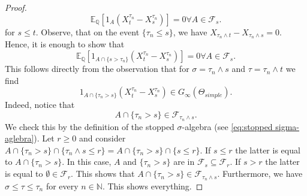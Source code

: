 \documentclass[11pt,a4paper,twoside,openany]{report}
\numberwithin{equation}{section}
\theoremstyle{plain} %
\theoremstyle{definition} %
\theoremstyle{remark} %
\begin{document}
\begin{proof}
\begin{equation*}
        \mathbb{E}_\mathbb{Q}[1_A(X^{\tau_n}_t-X^{\tau_n}_s)]=0 \forall A\in\mathcal{F}_s.
    \end{equation*}
    for \(s\leq t\). Observe, that on the event \(\{\tau_n\leq s\}\), we have \(X_{\tau_n\wedge t}-X_{\tau_n\wedge s}=0\). Hence, it is enough to show that 
    \begin{equation*}
          \mathbb{E}_\mathbb{Q}[1_{A\cap \{s>\tau_n\}}(X^{\tau_n}_t-X^{\tau_n}_s)]=0 \forall A\in\mathcal{F}_s.
    \end{equation*}
    This follows directly from the observation that 
    for \(\sigma = \tau_n\wedge s\) and \(\tau = \tau_n\wedge t\) we find
    \begin{equation*}
        1_{A\cap\{\tau_n>s\}}(X^{\tau_n}_t-X^{\tau_n}_s)\in G_{\infty}(\Theta_{simple}).
    \end{equation*}
    Indeed, notice that 
    \begin{equation*}
        A\cap\{\tau_n>s\}\in\mathcal{F}_{\tau_n\wedge s}.
    \end{equation*}
    We check this by the definition of the stopped \(\sigma\)-algebra (see \eqref{eq:stopped sigma-aglebra}). Let \(r\geq 0\) and consider \(A\cap\{\tau_n>s\}\cap\{\tau_n\wedge s\leq r\}=A\cap\{\tau_n>s\}\cap\{s\leq r\}\).
    If \(s\leq r\) the latter is equal to \(A\cap\{\tau_n>s\}\). In this case, \(A\) and \(\{\tau_n>s\}\) are in \(\mathcal{F}_s\subseteq\mathcal{F}_r\). If \(s>r\) the latter is equal to \(\emptyset\in\mathcal{F}_r\). This shows that \(A\cap\{\tau_n>s\}\in\mathcal{F}_{\tau_n\wedge s}\). Furthermore, we have \(\sigma\leq\tau\leq \tau_n\) for every \(n\in\mathbb{N}\). This shows everything.
     \end{proof}
     
\end{document}
